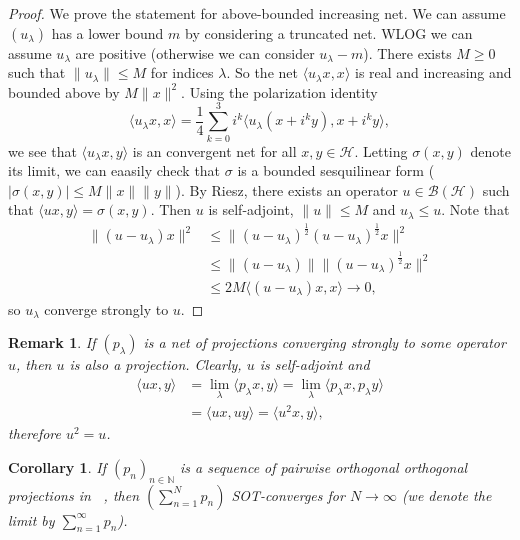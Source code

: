 \documentclass[10pt, a4paper]{article}
\newtheorem{corollary}[thm]{Corollary}
\newtheorem*{remark}{Remark}
\newenvironment{noticeC}{%
  \tcolorbox[%
  notitle,
  empty,
  enhanced,  %
  breakable,
  coltext=black, 
  fontupper=\rmfamily,
  noparskip,
  sharp corners,
  boxrule=-1pt,  %
  frame hidden,
  left=7pt,  %
  right=7pt,
  top=5pt,
  bottom=5pt,
  before skip=2.5ex plus 2pt,
  after skip=2.5ex plus 2pt,
  overlay unbroken and last={%
  },
  ]}
{\endtcolorbox}
\newenvironment{myproof}%
  {\begin{noticeC}\begin{proof}}%
  {\end{proof}\end{noticeC}}
\newcommand{\N}{\mathbb {N}}
\DeclareMathOperator{\bh}{\mathcal{B} (\mathcal{H})}
\begin{document}
\begin{myproof}
  We prove the statement for above-bounded increasing net. We can assume $(u_\lambda)$ has a lower bound $m$ by considering a truncated net. 
  WLOG we can assume $u_\lambda$ are positive (otherwise we can consider $u_\lambda - m$).
  There exists $M \geq 0$ such that $\|u_\lambda\| \leq M$ for indices $\lambda$. So the net $\langle u_\lambda x, x\rangle$
  is real and increasing and bounded above by $M \|x\|^2$. Using the polarization identity 
  $$\langle u_\lambda x, x\rangle = \frac{1}{4} \sum_{k = 0} ^3 i^k \langle u_\lambda (x + i^k y), x + i^k y\rangle,$$
  we see that $\langle u_\lambda x, y\rangle$ is an convergent net for all $x, y \in \mathcal{H}$.
  Letting $\sigma(x, y)$ denote its limit, we can eaasily check that $\sigma$ is a bounded sesquilinear form ($|\sigma(x, y)| \leq M\|x\| \|y\|$).
  By Riesz, there exists an operator $u \in \mathcal{B} (\mathcal{H})$ such that $\langle ux, y\rangle = \sigma(x, y)$.
  Then $u$ is self-adjoint, $\|u\| \leq M$ and $u_\lambda \leq u$. Note that 
  \begin{align*}
    \| (u - u_\lambda)x\|^2 &\leq \| (u - u_\lambda)^{\frac{1}{2}} (u - u_\lambda)^{\frac{1}{2}} x \|^2\\
    &\leq \| (u - u_\lambda) \| \| (u - u_\lambda)^{\frac{1}{2}} x\|^2\\
    &\leq 2M \langle (u - u_\lambda)x, x\rangle \to 0,
  \end{align*}
  so $u_\lambda$ converge strongly to $u$.
\end{myproof}

\begin{remark}
  If $(p_\lambda)$ is a net of projections converging strongly to some operator $u$, then $u$ is also a projection.
  Clearly, $u$ is self-adjoint and 
  \begin{align*}
    \langle ux, y \rangle &= \lim_{\lambda} \langle p_\lambda x, y\rangle = \lim_{\lambda} \langle p_\lambda x, p_\lambda y \rangle\\
    &= \langle ux, uy\rangle = \langle u^2 x, y\rangle,
  \end{align*}
  therefore $u^2 = u$.
\end{remark}

\begin{corollary}
  If $(p_n)_{n \in \N}$ is a sequence of pairwise orthogonal orthogonal projections in $\bh$,
  then $\left(\sum_{n = 1} ^N p_n\right)$ SOT-converges for $N \to \infty$ (we denote the limit by $\sum_{n = 1} ^\infty p_n$). 
\end{corollary}
\end{document}
